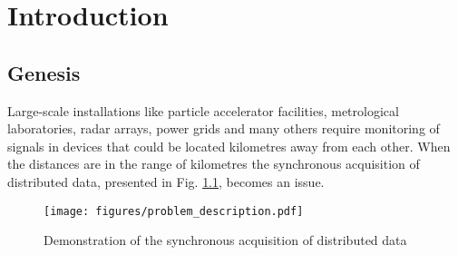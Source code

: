 \chapter{Introduction}


\section{Genesis}
    Large-scale installations like particle accelerator facilities, metrological laboratories, radar arrays, power grids and many others require monitoring of signals in devices that could be located kilometres away from each other. When the distances are in the range of kilometres the synchronous acquisition of distributed data, presented in Fig. \ref{fig:problem_description}, becomes an issue.
    \begin{figure}
    	\centerline{\texttt{[image: figures/problem\_description.pdf]}}
    	\caption{Demonstration of the synchronous acquisition of distributed data}
    	\label{fig:problem_description}
    \end{figure}
    
